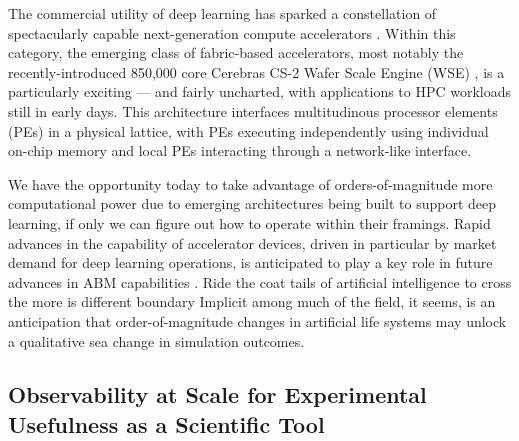
The commercial utility of deep learning has sparked a constellation of spectacularly capable next-generation compute accelerators \citep{zhang2016cambricon,emani2021accelerating,jia2019dissecting,medina2020habana}.
Within this category, the emerging class of fabric-based accelerators, most notably the recently-introduced 850,000 core Cerebras CS-2 Wafer Scale Engine (WSE) \citep{lauterbach2021path,lie2022cerebras}, is a particularly exciting --- and fairly uncharted, with applications to HPC workloads still in early days.
This architecture interfaces multitudinous processor elements (PEs) in a physical lattice, with PEs executing independently using individual on-chip memory and local PEs interacting through a network-like interface.

We have the opportunity today to take advantage of orders-of-magnitude more computational power due to emerging architectures being built to support deep learning, if only we can figure out how to operate within their framings.
Rapid advances in the capability of accelerator devices, driven in particular by market demand for deep learning operations, is anticipated to play a key role in future advances in ABM capabilities \citep{perumalla2022computer}.
Ride the coat tails of artificial intelligence to cross the more is different boundary \citep{anderson1972more}
Implicit among much of the field, it seems, is an anticipation that order-of-magnitude changes in artificial life systems may unlock a qualitative sea change in simulation outcomes.

\subsection{Observability at Scale for Experimental Usefulness as a Scientific Tool}


